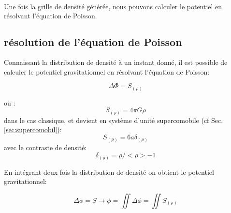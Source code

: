 \paragraph{}
Une fois la grille de densité générée, nous pouvons calculer le potentiel en résolvant l'équation de Poisson.

\subsection{résolution de l'équation de Poisson}

Connaissant la distribution de densité à un instant donné, il est possible de calculer le potentiel gravitationnel en résolvant l'équation de Poisson:

\begin{equation}
\Delta \Phi = S_{(\rho)}
\end{equation}

où :
\begin{equation}
S_{(\rho)} = 4 \pi G \rho
\end{equation}
dans le cas classique, et devient en système d'unité supercomobile (cf Sec. \ref{sec:supercomobil}):
\begin{equation}
S_{(\rho)} = 6 a \delta_{(\rho)}
\end{equation}
avec le contraste de densité: 
\begin{equation}
\delta_{(\rho)} = \rho / < \rho > - 1 
\end{equation}

En intégrant deux fois la distribution de densité on obtient le potentiel gravitationnel:

\begin{equation}
\Delta \phi = S \longrightarrow \phi = \iint \Delta \phi = \iint S_{(\rho)}
\end{equation}


